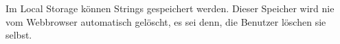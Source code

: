 \label{sec:localstorage}

Im Local Storage können Strings gespeichert werden. Dieser Speicher wird nie vom Webbrowser automatisch gelöscht, es sei denn, die Benutzer löschen sie selbst. 
\cite{w3LocalStorage}

